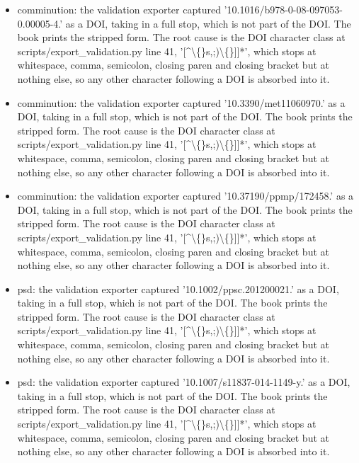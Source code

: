 \documentclass[10pt,a4paper,twoside]{report}
\begin{document}
\begin{itemize}

\item comminution: the validation exporter captured '10.1016/b978-0-08-097053-0.00005-4.' as a DOI, taking in a full stop, which is not part of the DOI. The book prints the stripped form. The root cause is the DOI character class at scripts/export\_validation.py line 41, '[\textasciicircum{}\textbackslash\{\}s,;)\textbackslash\{\}]]*', which stops at whitespace, comma, semicolon, closing paren and closing bracket but at nothing else, so any other character following a DOI is absorbed into it.

\item comminution: the validation exporter captured '10.3390/met11060970.' as a DOI, taking in a full stop, which is not part of the DOI. The book prints the stripped form. The root cause is the DOI character class at scripts/export\_validation.py line 41, '[\textasciicircum{}\textbackslash\{\}s,;)\textbackslash\{\}]]*', which stops at whitespace, comma, semicolon, closing paren and closing bracket but at nothing else, so any other character following a DOI is absorbed into it.

\item comminution: the validation exporter captured '10.37190/ppmp/172458.' as a DOI, taking in a full stop, which is not part of the DOI. The book prints the stripped form. The root cause is the DOI character class at scripts/export\_validation.py line 41, '[\textasciicircum{}\textbackslash\{\}s,;)\textbackslash\{\}]]*', which stops at whitespace, comma, semicolon, closing paren and closing bracket but at nothing else, so any other character following a DOI is absorbed into it.

\item psd: the validation exporter captured '10.1002/ppsc.201200021.' as a DOI, taking in a full stop, which is not part of the DOI. The book prints the stripped form. The root cause is the DOI character class at scripts/export\_validation.py line 41, '[\textasciicircum{}\textbackslash\{\}s,;)\textbackslash\{\}]]*', which stops at whitespace, comma, semicolon, closing paren and closing bracket but at nothing else, so any other character following a DOI is absorbed into it.

\item psd: the validation exporter captured '10.1007/s11837-014-1149-y.' as a DOI, taking in a full stop, which is not part of the DOI. The book prints the stripped form. The root cause is the DOI character class at scripts/export\_validation.py line 41, '[\textasciicircum{}\textbackslash\{\}s,;)\textbackslash\{\}]]*', which stops at whitespace, comma, semicolon, closing paren and closing bracket but at nothing else, so any other character following a DOI is absorbed into it.


\end{itemize}
\end{document}
